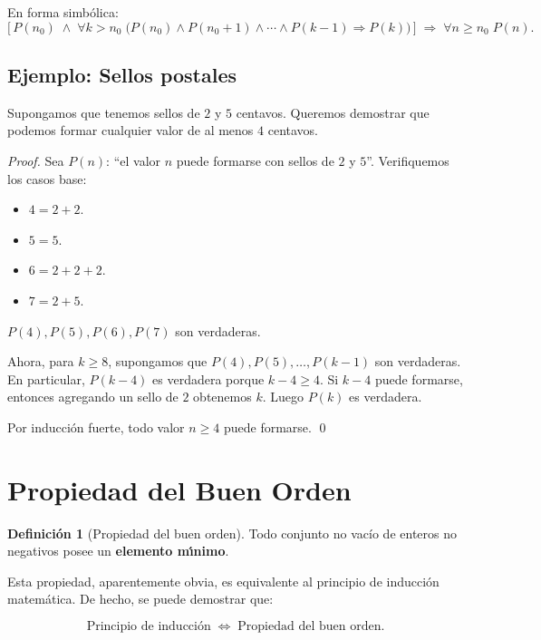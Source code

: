 \documentclass[11pt,a4paper]{article}
\theoremstyle{definition}
\newtheorem{definicion}{Definici\'on}[section]
\theoremstyle{plain}
\theoremstyle{definition}
\theoremstyle{definition}
\theoremstyle{remark}
\newcommand{\implica}{\Rightarrow}         %
\newcommand{\sii}{\Leftrightarrow}         %
\newcommand{\para}{\forall}               %
\begin{document}
En forma simb\'olica:
\[
\bigl[\,P(n_0) \;\wedge\;
\para k>n_0\;
\bigl(P(n_0)\wedge P(n_0+1)\wedge\cdots\wedge P(k-1) \implica P(k)\bigr)\,\bigr]
\;\implica\; \para n\geq n_0\; P(n).
\]

\subsection*{Ejemplo: Sellos postales}

Supongamos que tenemos sellos de $2$ y $5$ centavos. Queremos demostrar que
podemos formar cualquier valor de al menos $4$ centavos.

\begin{proof}
Sea $P(n)$: \enquote{el valor $n$ puede formarse con sellos de $2$ y $5$}.
Verifiquemos los casos base:
\begin{itemize}
    \item $4 = 2+2$.
    \item $5 = 5$.
    \item $6 = 2+2+2$.
    \item $7 = 2+5$.
\end{itemize}
$P(4), P(5), P(6), P(7)$ son verdaderas.

Ahora, para $k \geq 8$, supongamos que $P(4), P(5), \dots, P(k-1)$ son
verdaderas. En particular, $P(k-4)$ es verdadera porque $k-4 \geq 4$.
Si $k-4$ puede formarse, entonces agregando un sello de $2$ obtenemos $k$.
Luego $P(k)$ es verdadera.

Por inducci\'on fuerte, todo valor $n \geq 4$ puede formarse.
\qed
\end{proof}

\section{Propiedad del Buen Orden}

\begin{definicion}[Propiedad del buen orden]
\label{def:wellordering}
Todo conjunto no vac\'io de enteros no negativos posee un
\textbf{elemento m\'{\i}nimo}.
\end{definicion}

Esta propiedad, aparentemente obvia, es equivalente al principio de inducci\'on
matem\'atica. De hecho, se puede demostrar que:

\[
\text{Principio de inducci\'on} \;\sii\; \text{Propiedad del buen orden}.
\]
\end{document}
